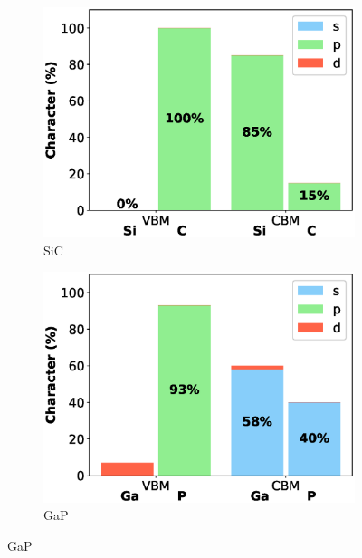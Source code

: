 \begin{figure}[!ht]
\medskip

\begin{subfigure}{0.45\textwidth}
  \includegraphics[width=\linewidth]{images/sic_2d_composition.eps}
  \caption{SiC}
\end{subfigure}\hfil %
\begin{subfigure}{0.45\textwidth}
  \includegraphics[width=\linewidth]{images/gap_2d_composition.eps}
  \caption{GaP}
\end{subfigure}\hfil %

\medskip


\end{figure}
